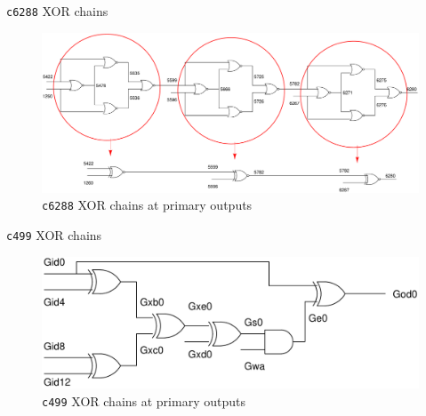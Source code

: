 \begin{frame}{\texttt{c6288} XOR chains}
       \begin{figure}
                \begin{center}
                \label{fig:c6288-c-l}
                \caption{\texttt{c6288} XOR chains at primary outputs}
                        \includegraphics[scale=0.2]{fig/c6288-xor-chains-2.pdf}
                \end{center}
        \end{figure}

\end{frame}

\begin{frame}{\texttt{c499} XOR chains}
       \begin{figure}
                \begin{center}
                \label{fig:c499-c-l}
                \caption{\texttt{c499} XOR chains at primary outputs}
                        \includegraphics[scale=0.2]{fig/c499-xor-chains.pdf}
                \end{center}
        \end{figure}

\end{frame}



